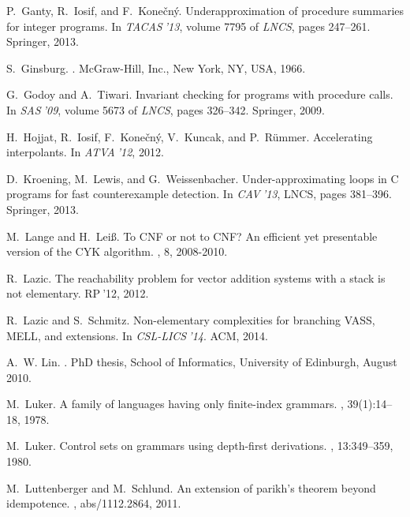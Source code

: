 \documentclass[final]{llncs}
\begin{document}
\begin{thebibliography}{10}
P.~Ganty, R.~Iosif, and F.~Kone\v{c}n\'{y}.
\newblock Underapproximation of procedure summaries for integer programs.
\newblock In {\em TACAS$\:$'13}, volume 7795 of {\em LNCS}, pages 247--261.
  Springer, 2013.

S.~Ginsburg.
.
\newblock McGraw-Hill, Inc., New York, NY, USA, 1966.

G.~Godoy and A.~Tiwari.
\newblock Invariant checking for programs with procedure calls.
\newblock In {\em SAS$\:$'09}, volume 5673 of {\em LNCS}, pages 326--342.
  Springer, 2009.

H.~Hojjat, R.~Iosif, F.~Kone\v{c}n\'{y}, V.~Kuncak, and P.~R\"ummer.
\newblock Accelerating interpolants.
\newblock In {\em ATVA$\:$'12}, 2012.

D.~Kroening, M.~Lewis, and G.~Weissenbacher.
\newblock Under-approximating loops in {C} programs for fast counterexample
  detection.
\newblock In {\em CAV$\:$'13}, LNCS, pages 381--396. Springer, 2013.

M.~Lange and H.~Lei{\ss}.
\newblock To \uppercase{CNF} or not to \uppercase{CNF}? {A}n efficient yet
  presentable version of the \uppercase{CYK} algorithm.
, 8, 2008-2010.

R.~Lazic.
\newblock The reachability problem for vector addition systems with a stack is
  not elementary.
\newblock RP$\:$'12, 2012.

R.~Lazic and S.~Schmitz.
\newblock Non-elementary complexities for branching {VASS}, {MELL}, and
  extensions.
\newblock In {\em CSL-LICS$\:$'14}. ACM, 2014.

A.~W. Lin.
.
\newblock PhD thesis, School of Informatics, University of Edinburgh, August
  2010.

M.~Luker.
\newblock A family of languages having only finite-index grammars.
, 39(1):14--18, 1978.

M.~Luker.
\newblock Control sets on grammars using depth-first derivations.
, 13:349--359, 1980.

M.~Luttenberger and M.~Schlund.
\newblock An extension of parikh's theorem beyond idempotence.
, abs/1112.2864, 2011.


\end{thebibliography}
\end{document}
